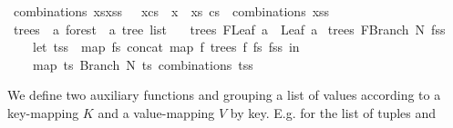 \begin{isabellebody}
{\isacharbar}{\kern0pt}\ {\isachardoublequoteopen}combinations\ {\isacharparenleft}{\kern0pt}xs{\isacharhash}{\kern0pt}xss{\isacharparenright}{\kern0pt}\ {\isacharequal}{\kern0pt}\ {\isacharbrackleft}{\kern0pt}\ x{\isacharhash}{\kern0pt}cs\ {\isachardot}{\kern0pt}\ x\ {\isacharless}{\kern0pt}{\isacharminus}{\kern0pt}\ xs{\isacharcomma}{\kern0pt}\ cs\ {\isacharless}{\kern0pt}{\isacharminus}{\kern0pt}\ combinations\ xss\ {\isacharbrackright}{\kern0pt}{\isachardoublequoteclose}\isanewline
\isanewline
{}\isamarkupfalse%
\ trees\ {\isacharcolon}{\kern0pt}{\isacharcolon}{\kern0pt}\ {\isachardoublequoteopen}{\isacharprime}{\kern0pt}a\ forest\ {\isasymRightarrow}\ {\isacharprime}{\kern0pt}a\ tree\ list{\isachardoublequoteclose}\ \isanewline
\ \ {\isachardoublequoteopen}trees\ {\isacharparenleft}{\kern0pt}FLeaf\ a{\isacharparenright}{\kern0pt}\ {\isacharequal}{\kern0pt}\ {\isacharbrackleft}{\kern0pt}Leaf\ a{\isacharbrackright}{\kern0pt}{\isachardoublequoteclose}\isanewline
{\isacharbar}{\kern0pt}\ {\isachardoublequoteopen}trees\ {\isacharparenleft}{\kern0pt}FBranch\ N\ fss{\isacharparenright}{\kern0pt}\ {\isacharequal}{\kern0pt}\ {\isacharparenleft}{\kern0pt}\isanewline
\ \ \ \ let\ tss\ {\isacharequal}{\kern0pt}\ {\isacharparenleft}{\kern0pt}map\ {\isacharparenleft}{\kern0pt}{\isasymlambda}fs{\isachardot}{\kern0pt}\ concat\ {\isacharparenleft}{\kern0pt}map\ {\isacharparenleft}{\kern0pt}{\isasymlambda}f{\isachardot}{\kern0pt}\ trees\ f{\isacharparenright}{\kern0pt}\ fs{\isacharparenright}{\kern0pt}{\isacharparenright}{\kern0pt}\ fss{\isacharparenright}{\kern0pt}\ in\isanewline
\ \ \ \ map\ {\isacharparenleft}{\kern0pt}{\isasymlambda}ts{\isachardot}{\kern0pt}\ Branch\ N\ ts{\isacharparenright}{\kern0pt}\ {\isacharparenleft}{\kern0pt}combinations\ tss{\isacharparenright}{\kern0pt}\isanewline
\ \ {\isacharparenright}{\kern0pt}{\isachardoublequoteclose}%
\isadelimdocument
%
\endisadelimdocument
%
\isatagdocument
%
\isamarkuptrue%
%
\endisatagdocument
{\isafolddocument}%
%
\isadelimdocument
%
\endisadelimdocument
%
\begin{isamarkuptext}%
We define two auxiliary functions  and  grouping a list of values  according to a key-mapping $K$
and a value-mapping $V$ by key. E.g. for the list of tuples  and

\end{isamarkuptext}
\end{isabellebody}
